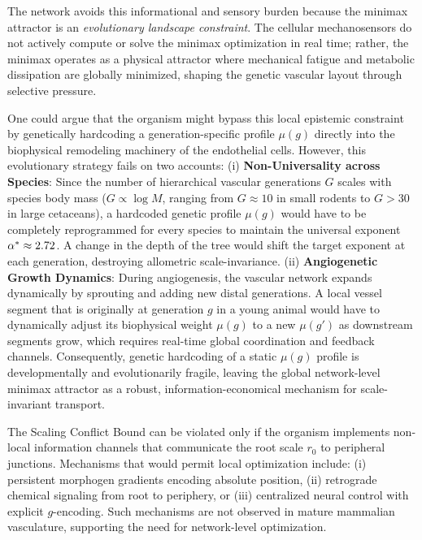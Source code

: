 The network avoids this informational and sensory burden because the minimax
attractor is an \emph{evolutionary landscape constraint}. The cellular
mechanosensors do not actively compute or solve the minimax optimization in real
time; rather, the minimax operates as a physical attractor where mechanical
fatigue and metabolic dissipation are globally minimized, shaping the genetic
vascular layout through selective pressure.

\begin{remark}
One could argue that the organism might bypass this local epistemic constraint
by genetically hardcoding a generation-specific profile $\mu(g)$ directly into
the biophysical remodeling machinery of the endothelial cells. However, this
evolutionary strategy fails on two accounts: (i) \textbf{Non-Universality across
Species}: Since the number of hierarchical vascular generations $G$ scales with
species body mass ($G \propto \log M$, ranging from $G \approx 10$ in small
rodents to $G > 30$ in large cetaceans), a hardcoded genetic profile $\mu(g)$
would have to be completely reprogrammed for every species to maintain the
universal exponent $\alpha^* \approx 2.72$. A change in the depth of
the tree would shift the target exponent at each generation, destroying
allometric scale-invariance. (ii) \textbf{Angiogenetic Growth Dynamics}: During
angiogenesis, the vascular network expands dynamically by sprouting and adding
new distal generations. A local vessel segment that is originally at generation
$g$ in a young animal would have to dynamically adjust its biophysical weight
$\mu(g)$ to a new $\mu(g')$ as downstream segments grow, which requires
real-time global coordination and feedback channels. Consequently, genetic
hardcoding of a static $\mu(g)$ profile is developmentally and evolutionarily
fragile, leaving the global network-level minimax attractor as a robust,
information-economical mechanism for scale-invariant transport.
\end{remark}

\begin{corollary}
\label{cor:violation}
The Scaling Conflict Bound can be violated only if the organism implements
non-local information channels that communicate the root scale $r_0$ to
peripheral junctions. Mechanisms that would permit local optimization include:
(i) persistent morphogen gradients encoding absolute position, (ii) retrograde
chemical signaling from root to periphery, or (iii) centralized neural control
with explicit $g$-encoding. Such mechanisms are not observed in mature mammalian
vasculature, supporting the need for network-level optimization.
\end{corollary}

